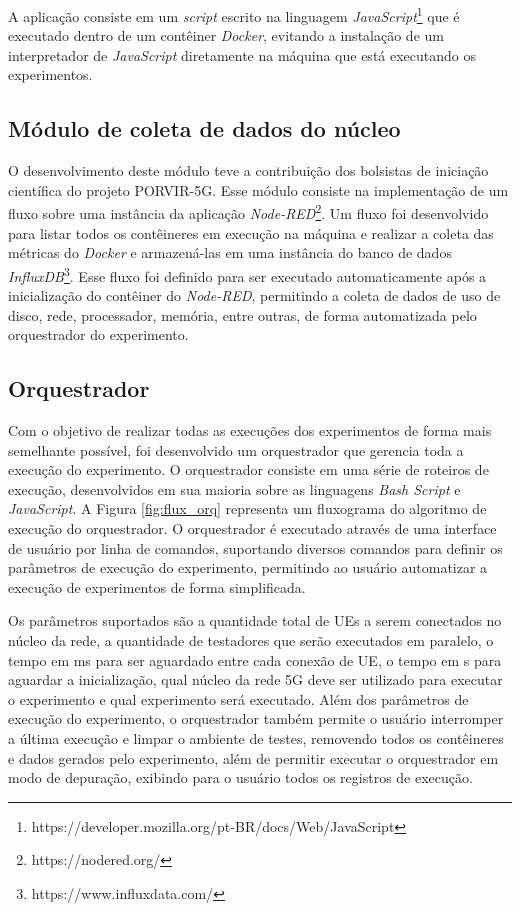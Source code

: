 A aplicação consiste em um \textit{script} escrito na linguagem \textit{JavaScript}\footnote{https://developer.mozilla.org/pt-BR/docs/Web/JavaScript} que é executado dentro de um contêiner \textit{Docker}, evitando a instalação de um interpretador de \textit{JavaScript} diretamente na máquina que está executando os experimentos.

\subsection{Módulo de coleta de dados do núcleo}

O desenvolvimento deste módulo teve a contribuição dos bolsistas de iniciação científica do projeto PORVIR-5G.
Esse módulo consiste na implementação de um fluxo sobre uma instância da aplicação \textit{Node-RED}\footnote{https://nodered.org/}.
Um fluxo foi desenvolvido para listar todos os contêineres em execução na máquina e realizar a coleta das métricas do \textit{Docker} e armazená-las em uma instância do banco de dados \textit{InfluxDB}\footnote{https://www.influxdata.com/}. Esse fluxo foi definido para ser executado automaticamente após a inicialização do contêiner do \textit{Node-RED}, permitindo a coleta de dados de uso de disco, rede, processador, memória, entre outras, de forma automatizada pelo orquestrador do experimento.

\subsection{Orquestrador}
\label{sub:arch-orchestrator}

Com o objetivo de realizar todas as execuções dos experimentos de forma mais semelhante possível, foi desenvolvido um orquestrador que gerencia toda a execução do experimento.
O orquestrador consiste em uma série de roteiros de execução, desenvolvidos em sua maioria sobre as linguagens \textit{Bash Script} e \textit{JavaScript}.
A Figura \ref{fig:flux_orq} representa um fluxograma do algoritmo de execução do orquestrador.
O orquestrador é executado através de uma interface de usuário por linha de comandos, suportando diversos comandos para definir os parâmetros de execução do experimento, permitindo ao usuário automatizar a execução de experimentos de forma simplificada.

Os parâmetros suportados são a quantidade total de UEs a serem conectados no núcleo da rede, a quantidade de testadores que serão executados em paralelo, o tempo em ms para ser aguardado entre cada conexão de UE, o tempo em s para aguardar a inicialização, qual núcleo da rede 5G deve ser utilizado para executar o experimento e qual experimento será executado.
Além dos parâmetros de execução do experimento, o orquestrador também permite o usuário interromper a última execução e limpar o ambiente de testes, removendo todos os contêineres e dados gerados pelo experimento, além de permitir executar o orquestrador em modo de depuração, exibindo para o usuário todos os registros de execução.

